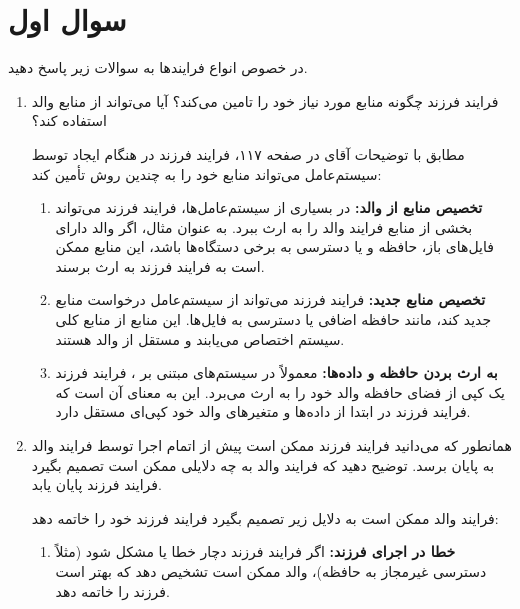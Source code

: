 \section{سوال اول}

در خصوص انواع فرایندها به سوالات زیر پاسخ دهید.
\begin{enumerate}
	\item 
	فرایند فرزند چگونه منابع مورد نیاز خود را تامین می‌کند؟ آیا می‌تواند از منابع والد استفاده کند؟
	\begin{qsolve}
		مطابق با توضیحات آقای  در صفحه ۱۱۷، فرایند فرزند در هنگام ایجاد توسط سیستم‌عامل می‌تواند منابع خود را به چندین روش تأمین کند:
		\begin{enumerate}
			\item 
			\textbf{تخصیص منابع از والد:} در بسیاری از سیستم‌عامل‌ها، فرایند فرزند می‌تواند بخشی از منابع فرایند والد را به ارث ببرد. به عنوان مثال، اگر والد دارای فایل‌های باز، حافظه و یا دسترسی به برخی دستگاه‌ها باشد، این منابع ممکن است به فرایند فرزند به ارث برسند.
			
			
			\item 
			\textbf{تخصیص منابع جدید:} فرایند فرزند می‌تواند از سیستم‌عامل درخواست منابع جدید کند، مانند حافظه اضافی یا دسترسی به فایل‌ها. این منابع از منابع کلی سیستم اختصاص می‌یابند و مستقل از والد هستند.
			
			
			\item 
			\textbf{به ارث بردن حافظه و داده‌ها:} معمولاً در سیستم‌های مبتنی بر ، فرایند فرزند یک کپی از فضای حافظه والد خود را به ارث می‌برد. این به معنای آن است که فرایند فرزند در ابتدا از داده‌ها و متغیرهای والد خود کپی‌ای مستقل دارد.
		\end{enumerate}
	
	\end{qsolve}
	
	
	
	\item 
	همانطور که می‌دانید فرایند فرزند ممکن است پیش از اتمام اجرا توسط فرایند والد به پایان برسد. توضیح دهید که فرایند والد به چه دلایلی ممکن است تصمیم بگیرد فرایند فرزند پایان یابد.
	\begin{qsolve}
		فرایند والد ممکن است به دلایل زیر تصمیم بگیرد فرایند فرزند خود را خاتمه دهد:
		
		\begin{enumerate}
			\item 
			\textbf{خطا در اجرای فرزند:} اگر فرایند فرزند دچار خطا یا مشکل شود (مثلاً دسترسی غیرمجاز به حافظه)، والد ممکن است تشخیص دهد که بهتر است فرزند را خاتمه دهد.
			

\end{enumerate}
\end{qsolve}
\end{enumerate}
